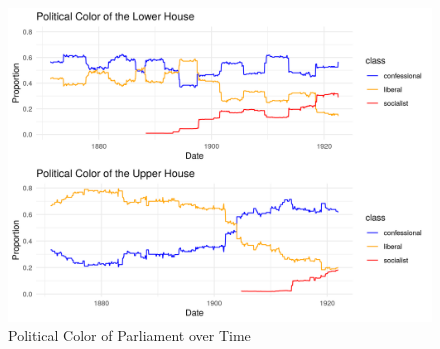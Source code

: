%
%
\clearpage
\printbibliography

\clearpage





\clearpage


\clearpage


\clearpage


\clearpage

\begin{landscape}

\begin{figure}
    \centering
    \includegraphics[scale=0.80]{figures/step4comp.png}
    \caption{Political Color of Parliament over Time}
    \label{fig:parltime}
\end{figure}

\end{landscape}
\clearpage

